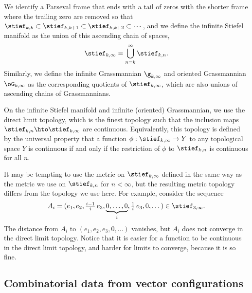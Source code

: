 We identify a Parseval frame that ends with a tail of zeros with the shorter frame where the trailing zero are removed so that $\stief_{k,k} \subset \stief_{k,k+1} \subset \stief_{k,k+2} \subset \cdots$,
and we define the infinite Stiefel manifold as the union of this ascending chain of spaces,
\[ \stief_{k,\infty} = \bigcup_{n=k}^\infty \stief_{k,n}. \]
Similarly, we define the infinite Grassmannian $\g_{k,\infty}$ and oriented Grassmannian $\oG_{k,\infty}$ as the corresponding quotients of $\stief_{k,\infty}$, which are also unions of ascending chains of Grassmannians.

On the infinite Stiefel manifold and infinite (oriented) Grassmannian, we use the direct limit topology, which is the finest topology such that the inclusion maps \hbox{$\stief_{k,n} \hto \stief_{k,\infty}$} are continuous.
Equivalently, this topology is defined by the universal property that a function $\phi : \stief_{k,\infty} \to Y$ to any topological space $Y$ is continuous if and only if the restriction of $\phi$ to $\stief_{k,n}$ is continuous for all $n$.

\begin{warning}
It may be tempting to use the metric on $\stief_{k,\infty}$ defined in the same way as the metric we use on $\stief_{k,n}$ for $n<\infty$, but the resulting metric topology differs from the topology we use here.
For example, consider the sequence
\[A_i = (e_1,e_2,\tfrac{i-1}{i}\,e_3,\underbrace{0,\dots,0}_i,\tfrac{1}{i}\,e_3,0,\dots) \in \stief_{3,\infty}. \]
The distance from $A_i$ to $(e_1,e_2,e_3,0,\dots)$ vanishes, but $A_i$ does not converge in the direct limit topology.
Notice that it is easier for a function to be continuous in the direct limit topology, and harder for limits to converge, because it is so fine.
\end{warning}

\subsection{Combinatorial data from vector configurations}\label{subsection-combinatorial-data}

